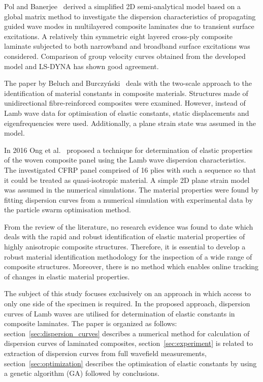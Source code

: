 \documentclass[preprint,12pt]{elsarticle}
\begin{document}
	Pol and Banerjee~\cite{Pol2013} derived a simplified 2D semi-analytical model based on a global matrix method to investigate the dispersion characteristics of propagating guided wave modes in multilayered composite laminates due to transient surface excitations. A relatively thin symmetric eight layered cross-ply composite laminate subjected to both narrowband and broadband surface excitations was considered. Comparison of group velocity curves obtained from the developed model and LS-DYNA has shown good agreement.

	The paper by Beluch and Burczyński~\cite{Beluch2014} deals with the two-scale approach to the identification of material constants in composite materials. Structures made of unidirectional fibre-reinforced composites were examined. However, instead of Lamb wave data for optimisation of elastic constants, static displacements and eigenfrequencies were used. Additionally, a plane strain state was assumed in the model.

	In 2016 Ong et al.~\cite{Ong2016} proposed a technique for determination of elastic properties of the woven composite panel using the Lamb wave dispersion characteristics. The investigated CFRP panel comprised of 16 plies with such a sequence so that it could be treated as quasi-isotropic material. A simple 2D plane strain model was assumed in the numerical simulations. The material properties were found by fitting dispersion curves from a numerical simulation with experimental data by the particle swarm optimisation method. 

	From the review of the literature, no research evidence was found to date which deals with the rapid and robust identification of elastic material properties of highly anisotropic composite structures. Therefore, it is essential to develop a robust material identification methodology for the inspection of a wide range of composite structures. Moreover, there is no method which enables online tracking of changes in elastic material properties.

	The subject of this study focuses exclusively on an approach in which access to only one side of the specimen is required. In the proposed approach, dispersion curves of Lamb waves are utilised for determination of elastic constants in composite laminates. The paper is organized as follows: section~\ref{sec:dispersion_curves} describes a numerical method for calculation of dispersion curves of laminated composites, section~\ref{sec:experiment} is related to extraction of dispersion curves from full wavefield measurements, section~\ref{sec:optimization} describes the optimisation of elastic constants by using a genetic algorithm (GA) followed by conclusions.
\end{document}
